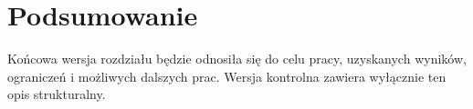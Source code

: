 \chapter{Podsumowanie}

Końcowa wersja rozdziału będzie odnosiła się do celu pracy, uzyskanych wyników, ograniczeń i możliwych dalszych prac. Wersja kontrolna zawiera wyłącznie ten opis strukturalny.
